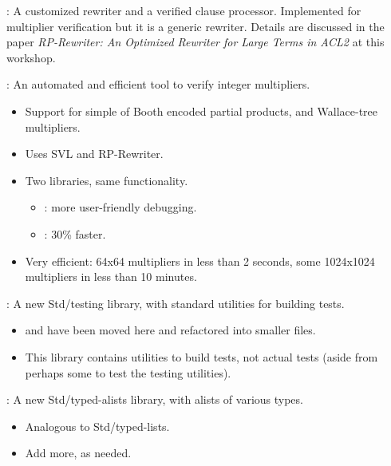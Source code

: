
\begin{frame}

\newlibtitle

:
A customized rewriter and a verified
clause processor. Implemented for multiplier verification but it is a
generic rewriter. Details are discussed in the paper {\it RP-Rewriter: An
Optimized Rewriter for Large Terms in ACL2} at this workshop.

\separation

:
An automated and efficient tool to verify integer multipliers.
\begin{itemize}
\item Support for simple of Booth encoded partial products, and
  Wallace-tree multipliers.
\item Uses SVL and RP-Rewriter.
\item Two libraries, same  functionality.
  \begin{itemize}
  \item {}: more  user-friendly debugging.
  \item{}: 30\% faster.
  \end{itemize}
\item  Very efficient:  64x64  multipliers  in less  than  2 seconds,  some
  1024x1024 multipliers in less than 10 minutes.
\end{itemize}

\end{frame}


\begin{frame}

\newlibtitle

:
A new Std/testing library, with standard utilities for building tests.
\begin{itemize}
\item
{} and 
have been moved here and refactored into smaller files.
\item
This library contains utilities to build tests,
not actual tests (aside from perhaps some to test the testing utilities).
\end{itemize}

\separation

:
A new Std/typed-alists library, with alists of various types.
\begin{itemize}
\item
Analogous to Std/typed-lists.
\item
Add more, as needed.
\end{itemize}

\end{frame}


